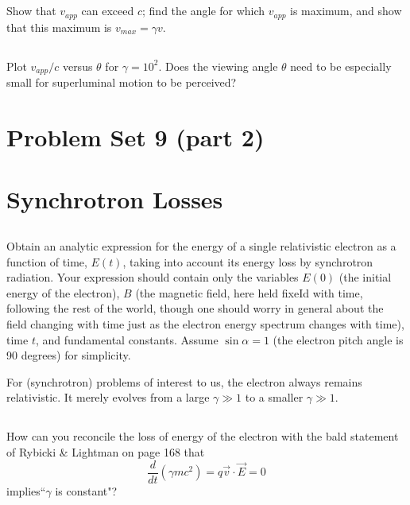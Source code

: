 \documentclass[11pt]{article}
\begin{document}
\subsection{}
Show that $v_{app}$ can exceed $c$; find the angle for which $v_{app}$ is maximum,
and show that this maximum is $v_{max}=\gamma v$.

\subsection{}
Plot $v_{app}/c$ versus $\theta$ for $\gamma=10^2$.  Does the viewing angle $\theta$
need to be especially small for superluminal motion to be perceived?

\section{Problem Set 9 (part 2)}

\section{Synchrotron Losses}

\subsection{}
Obtain an analytic expression for the energy of a single relativistic
electron as a function of time, $E(t)$, taking into account its energy loss by
synchrotron radiation. Your expression should contain only the variables $E(0)$
(the initial energy of the electron), $B$ (the magnetic field, here held fixeId
with time, following the rest of the world, though one should worry in general
about the field changing with time just as the electron energy spectrum changes
with time), time $t$, and fundamental constants. Assume $\sin\alpha=1$ (the electron
pitch angle is 90 degrees) for simplicity.

For (synchrotron) problems of interest to us, the electron always remains
relativistic. It merely evolves from a large $\gamma\gg1$ to a smaller $\gamma\gg1$.

\subsection{}
How can you reconcile the loss of energy of the electron with the bald
statement of Rybicki \& Lightman on page 168 that 
\begin{equation}
\frac{d}{dt}(\gamma mc^2)=q\vec v\cdot \vec E=0
\end{equation}
implies``$\gamma$ is constant"?
\end{document}

